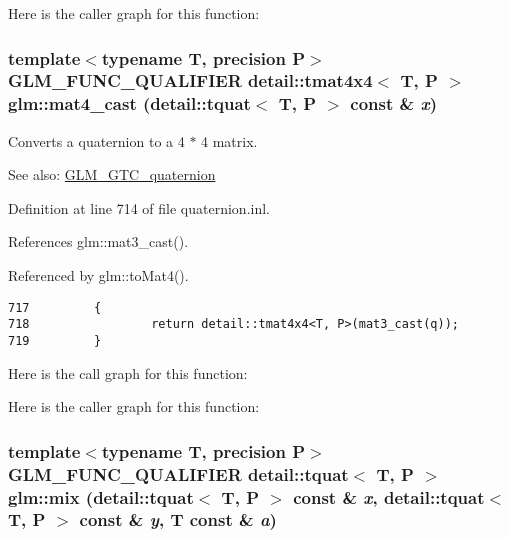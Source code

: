 Here is the caller graph for this function:\hypertarget{group__gtc__quaternion_gbe87795cddd91732acb07830f8125a2d}{
\subsubsection[mat4\_\-cast]{\setlength{\rightskip}{0pt plus 5cm}template$<$typename T, precision P$>$ GLM\_\-FUNC\_\-QUALIFIER detail::tmat4x4$<$ T, P $>$ glm::mat4\_\-cast (detail::tquat$<$ T, P $>$ const \& {\em x})}}
\label{group__gtc__quaternion_gbe87795cddd91732acb07830f8125a2d}


Converts a quaternion to a 4 $\ast$ 4 matrix.

\begin{Desc}
\item[See also:]\hyperlink{group__gtc__quaternion}{GLM\_\-GTC\_\-quaternion} \end{Desc}


Definition at line 714 of file quaternion.inl.

References glm::mat3\_\-cast().

Referenced by glm::toMat4().

\begin{Code}\begin{verbatim}717         {
718                 return detail::tmat4x4<T, P>(mat3_cast(q));
719         }
\end{verbatim}
\end{Code}




Here is the call graph for this function:

Here is the caller graph for this function:\hypertarget{group__gtc__quaternion_gd53916e67eedc8bb259548504b713350}{
\subsubsection[mix]{\setlength{\rightskip}{0pt plus 5cm}template$<$typename T, precision P$>$ GLM\_\-FUNC\_\-QUALIFIER detail::tquat$<$ T, P $>$ glm::mix (detail::tquat$<$ T, P $>$ const \& {\em x}, \/  detail::tquat$<$ T, P $>$ const \& {\em y}, \/  T const \& {\em a})}}
\label{group__gtc__quaternion_gd53916e67eedc8bb259548504b713350}


